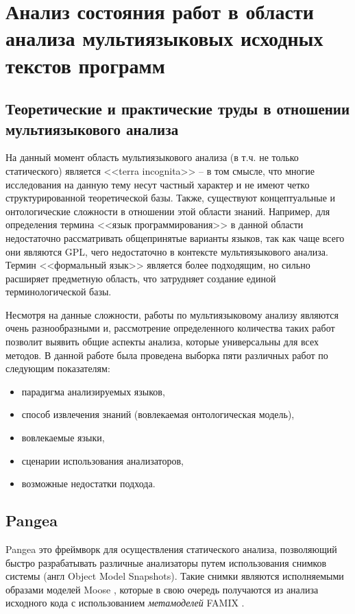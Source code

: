 \chapter{Анализ состояния работ в области анализа мультиязыковых исходных текстов программ} \label{sec:num2}

\section{Теоретические и практические труды в отношении мультиязыкового анализа} \label{ssec:num2}

На данный момент область мультиязыкового анализа (в т.ч. не только статического) является
<<terra incognita>> -- в том смысле, что многие исследования на данную тему несут частный характер и не
имеют четко структурированной теоретической базы. Также, существуют концептуальные и онтологические сложности
в отношении этой области знаний. Например, для определения термина <<язык программирования>> в данной области
недостаточно рассматривать общепринятые варианты языков, так как чаще всего они являются GPL,
чего недостаточно в контексте мультиязыкового анализа. Термин <<формальный язык>> является более подходящим, но
сильно расширяет предметную область, что затрудняет создание единой терминологической базы.

Несмотря на данные сложности, работы по мультиязыковому анализу являются очень разнообразными и, рассмотрение
определенного количества таких работ позволит выявить общие аспекты анализа, которые универсальны для всех методов.
В данной работе была проведена выборка пяти различных работ по следующим показателям:
\begin{itemize}
    \item парадигма анализируемых языков,
    \item способ извлечения знаний (вовлекаемая онтологическая модель),
    \item вовлекаемые языки,
    \item сценарии использования анализаторов,
    \item возможные недостатки подхода.
\end{itemize}

\section{Pangea} \label{ssec:pangea}

Pangea \cite{pangea} это фреймворк для осуществления статического анализа, позволяющий
быстро разрабатывать различные анализаторы путем использования снимков системы (англ Object Model Snapshots).
Такие снимки являются исполняемыми образами моделей Moose \cite{moose}, которые в свою очередь получаются из
анализа исходного кода с использованием \textit{метамоделей} FAMIX \cite{famix}.

